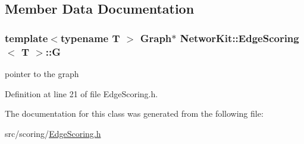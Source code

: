\subsection{Member Data Documentation}
\hypertarget{class_networ_kit_1_1_edge_scoring_a236d40c30ccbb022125d3dc915865d8a}{
\subsubsection[{G}]{\setlength{\rightskip}{0pt plus 5cm}template$<$typename T $>$ {\bf Graph}$\ast$ {\bf Networ\-Kit\-::\-Edge\-Scoring}$<$ T $>$\-::G\hspace{0.3cm}{\ttfamily [protected]}}}\label{class_networ_kit_1_1_edge_scoring_a236d40c30ccbb022125d3dc915865d8a}


pointer to the graph 



Definition at line 21 of file Edge\-Scoring.\-h.



The documentation for this class was generated from the following file\-:\begin{DoxyCompactItemize}
\item 
src/scoring/\hyperlink{_edge_scoring_8h}{Edge\-Scoring.\-h}\end{DoxyCompactItemize}
